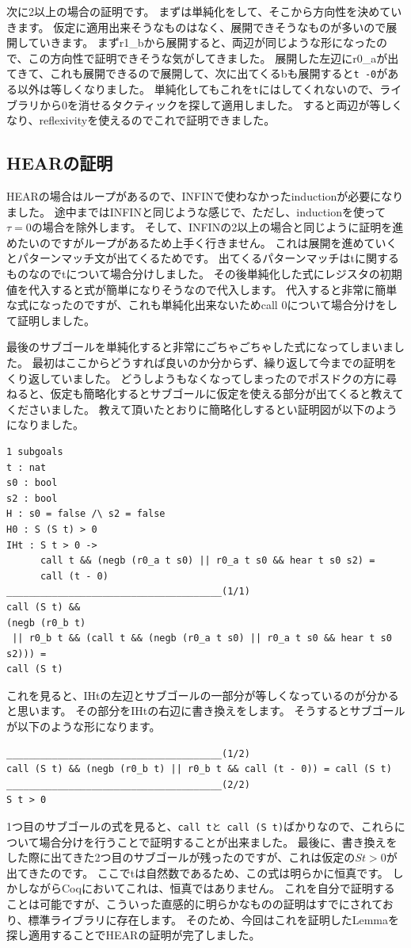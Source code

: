 \documentclass{jsbook}
\begin{document}
次に2以上の場合の証明です。
まずは単純化をして、そこから方向性を決めていきます。
仮定に適用出来そうなものはなく、展開できそうなものが多いので展開していきます。
まずr1\_bから展開すると、両辺が同じような形になったので、この方向性で証明できそうな気がしてきました。
展開した左辺にr0\_aが出てきて、これも展開できるので展開して、次に出てくるbも展開すると\verb|t -0|がある以外は等しくなりました。
単純化してもこれを\verb|t|にはしてくれないので、ライブラリから0を消せるタクティックを探して適用しました。
すると両辺が等しくなり、reflexivityを使えるのでこれで証明できました。
\subsection*{HEARの証明}
HEARの場合はループがあるので、INFINで使わなかったinductionが必要になりました。
途中まではINFINと同じような感じで、ただし、inductionを使って$\tau = 0$の場合を除外します。
そして、INFINの2以上の場合と同じように証明を進めたいのですがループがあるため上手く行きません。
これは展開を進めていくとパターンマッチ文が出てくるためです。
出てくるパターンマッチはtに関するものなのでtについて場合分けしました。
その後単純化した式にレジスタの初期値を代入すると式が簡単になりそうなので代入します。
代入すると非常に簡単な式になったのですが、これも単純化出来ないためcall 0について場合分けをして証明しました。

最後のサブゴールを単純化すると非常にごちゃごちゃした式になってしまいました。
最初はここからどうすれば良いのか分からず、繰り返して今までの証明をくり返していました。
どうしようもなくなってしまったのでポスドクの方に尋ねると、仮定も簡略化するとサブゴールに仮定を使える部分が出てくると教えてくださいました。
教えて頂いたとおりに簡略化しするとい証明図が以下のようになりました。
\begin{verbatim}
1 subgoals
t : nat
s0 : bool
s2 : bool
H : s0 = false /\ s2 = false
H0 : S (S t) > 0
IHt : S t > 0 ->
      call t && (negb (r0_a t s0) || r0_a t s0 && hear t s0 s2) =
      call (t - 0)
______________________________________(1/1)
call (S t) &&
(negb (r0_b t)
 || r0_b t && (call t && (negb (r0_a t s0) || r0_a t s0 && hear t s0 s2))) =
call (S t)
\end{verbatim}
これを見ると、IHtの左辺とサブゴールの一部分が等しくなっているのが分かると思います。
その部分をIHtの右辺に書き換えをします。
そうするとサブゴールが以下のような形になります。
\begin{verbatim}
______________________________________(1/2)
call (S t) && (negb (r0_b t) || r0_b t && call (t - 0)) = call (S t)
______________________________________(2/2)
S t > 0
\end{verbatim}
1つ目のサブゴールの式を見ると、\verb|call tと call (S t)|ばかりなので、これらについて場合分けを行うことで証明することが出来ました。
最後に、書き換えをした際に出てきた2つ目のサブゴールが残ったのですが、これは仮定の$S t>0$が出てきたのです。
ここでtは自然数であるため、この式は明らかに恒真です。
しかしながらCoqにおいてこれは、恒真ではありません。
これを自分で証明することは可能ですが、こういった直感的に明らかなものの証明はすでにされており、標準ライブラリに存在します。
そのため、今回はこれを証明したLemmaを探し適用することでHEARの証明が完了しました。
\end{document}
